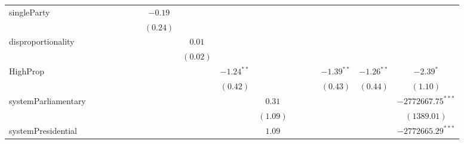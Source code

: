 \documentclass[a4paper]{article}\usepackage{graphicx, color}
\begin{document}
\begin{landscape}
\begin{table}
{{\begin{tabular}{l c c c c c c c c c c c c c c c c }
singleParty         &               &               &               &               &               &               & $-0.19$       &               &               &          &               &          &          &              &              &                     \\
                    &               &               &               &               &               &               & $(0.24)$      &               &               &          &               &          &          &              &              &                     \\
disproportionality  &               &               &               &               &               &               &               & $0.01$        &               &          &               &          &          &              &              &                     \\
                    &               &               &               &               &               &               &               & $(0.02)$      &               &          &               &          &          &              &              &                     \\
HighProp            &               &               &               &               &               &               &               &               & $-1.24^{**}$  &          &               &          &          & $-1.39^{**}$ & $-1.26^{**}$ & $-2.39^{*}$         \\
                    &               &               &               &               &               &               &               &               & $(0.42)$      &          &               &          &          & $(0.43)$     & $(0.44)$     & $(1.10)$            \\
systemParliamentary &               &               &               &               &               &               &               &               &               & $0.31$   &               &          &          &              &              & $-2772667.75^{***}$ \\
                    &               &               &               &               &               &               &               &               &               & $(1.09)$ &               &          &          &              &              & $(1389.01)$         \\
systemPresidential  &               &               &               &               &               &               &               &               &               & $1.09$   &               &          &          &              &              & $-2772665.29^{***}$ \\

\end{tabular}}}
\end{table}
\end{landscape}
\end{document}
